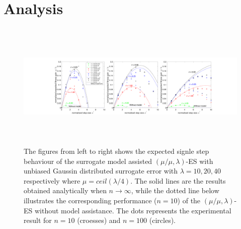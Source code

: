 





\section{Analysis}
\begin{center}
\begin{figure}
\includegraphics[height=2.4in, width=6.1in]{expectedFitGain_v1}
\caption{The figures from left to right shows the expected signle step behaviour of the surrogate model assisted $(\mu/\mu,\lambda)$-ES with unbiased Gaussin distributed surrogate error with $\lambda=10,20,40$ respectively where $\mu = ceil(\lambda/4)$. The solid lines are the results obtained analytically when $n \rightarrow \infty$, while the dotted line below illustrates the corresponding performance ($n=10$) of the $(\mu/\mu,\lambda)$-ES without model assistance. The dots represents the experimental result for $n=10$ (croesses) and $n=100$ (circles).}
\end{figure}
\end{center}

